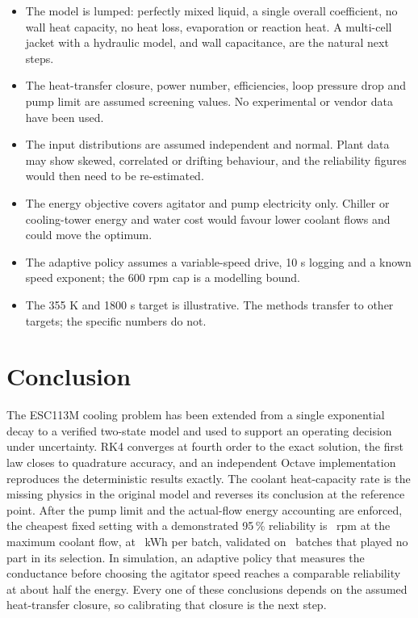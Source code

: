 \documentclass[11pt,letterpaper]{article}
\begin{document}
\begin{itemize}[leftmargin=*]
\item The model is lumped: perfectly mixed liquid, a single overall coefficient, no wall heat capacity, no heat loss, evaporation or reaction heat. A multi-cell jacket with a hydraulic model, and wall capacitance, are the natural next steps.
\item The heat-transfer closure, power number, efficiencies, loop pressure drop and pump limit are assumed screening values. No experimental or vendor data have been used.
\item The input distributions are assumed independent and normal. Plant data may show skewed, correlated or drifting behaviour, and the reliability figures would then need to be re-estimated.
\item The energy objective covers agitator and pump electricity only. Chiller or cooling-tower energy and water cost would favour lower coolant flows and could move the optimum.
\item The adaptive policy assumes a variable-speed drive, 10 s logging and a known speed exponent; the 600 rpm cap is a modelling bound.
\item The 355 K and 1800 s target is illustrative. The methods transfer to other targets; the specific numbers do not.
\end{itemize}

\section{Conclusion}

The ESC113M cooling problem has been extended from a single exponential decay to a verified two-state model and used to support an operating decision under uncertainty. RK4 converges at fourth order to the exact solution, the first law closes to quadrature accuracy, and an independent Octave implementation reproduces the deterministic results exactly. The coolant heat-capacity rate is the missing physics in the original model and reverses its conclusion at the reference point. After the pump limit and the actual-flow energy accounting are enforced, the cheapest fixed setting with a demonstrated 95\,\% reliability is \vRecRpm\ rpm at the maximum coolant flow, at \vRecE\ kWh per batch, validated on \vNVal\ batches that played no part in its selection. In simulation, an adaptive policy that measures the conductance before choosing the agitator speed reaches a comparable reliability at about half the energy. Every one of these conclusions depends on the assumed heat-transfer closure, so calibrating that closure is the next step.
\end{document}
